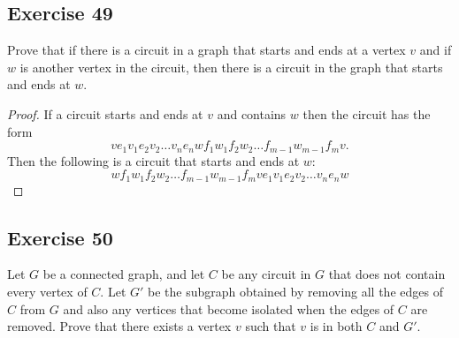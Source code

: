 \documentclass[14pt]{extarticle}
\begin{document}
\subsection{Exercise 49}
Prove that if there is a circuit in a graph that starts and ends at a vertex \(v\) and if \(w\) is another vertex in the
circuit, then there is a circuit in the graph that starts and ends at \(w\).

\begin{proof}
    If a circuit starts and ends at \(v\) and contains \(w\) then the circuit has the form
    \[
        ve_1v_1e_2v_2 \ldots v_ne_nwf_1w_1f_2w_2 \ldots f_{m-1}w_{m-1}f_mv.
    \]
    Then the following is a circuit that starts and ends at \(w\):
    \[
        wf_1w_1f_2w_2 \ldots f_{m-1}w_{m-1}f_mve_1v_1e_2v_2 \ldots v_ne_nw
    \]
\end{proof}

\subsection{Exercise 50}
Let \(G\) be a connected graph, and let \(C\) be any circuit in \(G\) that does not contain every vertex of \(C\). Let
\(G'\) be the subgraph obtained by removing all the edges of \(C\) from \(G\) and also any vertices that become isolated
when the edges of \(C\) are removed. Prove that there exists a vertex \(v\) such that \(v\) is in both \(C\) and \(G'\).
\end{document}
